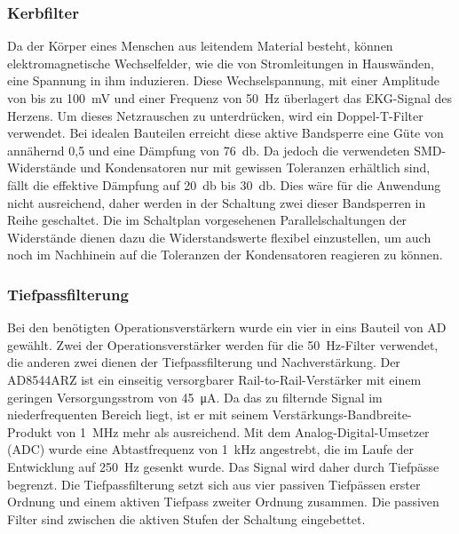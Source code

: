 \subsubsection{Kerbfilter}

Da der Körper eines Menschen aus leitendem Material besteht, können elektromagnetische Wechselfelder, wie die von Stromleitungen in Hauswänden, eine Spannung in ihm induzieren. Diese Wechselspannung, mit einer Amplitude von bis zu \SI{100}{\milli\volt} und einer Frequenz von \SI{50}{\hertz} überlagert das EKG-Signal des Herzens. Um dieses Netzrauschen zu unterdrücken, wird ein Doppel-T-Filter verwendet. Bei idealen Bauteilen erreicht diese aktive Bandsperre eine Güte von annähernd 0,5 und eine Dämpfung von \SI{76}{\decibel}. Da jedoch die verwendeten SMD-Widerstände und Kondensatoren nur mit gewissen Toleranzen erhältlich sind, fällt die effektive Dämpfung auf \SI{20}{\decibel} bis \SI{30}{\decibel}. Dies wäre für die Anwendung nicht ausreichend, daher werden in der Schaltung zwei dieser Bandsperren in Reihe geschaltet. Die im Schaltplan vorgesehenen Parallelschaltungen der Widerstände dienen dazu die Widerstandswerte flexibel einzustellen, um auch noch im Nachhinein auf die Toleranzen der Kondensatoren reagieren zu können. 

\subsubsection{Tiefpassfilterung}

Bei den benötigten Operationsverstärkern wurde ein vier in eins Bauteil von AD gewählt. Zwei der Operationsverstärker werden für die \SI{50}{\hertz}-Filter verwendet, die anderen zwei dienen der Tiefpassfilterung und Nachverstärkung. Der AD8544ARZ ist ein einseitig versorgbarer Rail-to-Rail-Verstärker mit einem geringen Versorgungsstrom von \SI{45}{\micro\ampere}. Da das zu filternde Signal im niederfrequenten Bereich liegt, ist er mit seinem Verstärkungs-Bandbreite-Produkt von \SI{1}{\mega\hertz} mehr als ausreichend. Mit dem Analog-Digital-Umsetzer (ADC) wurde eine Abtastfrequenz von \SI{1}{\kilo\hertz} angestrebt, die im Laufe der Entwicklung auf \SI{250}{\hertz} gesenkt wurde. Das Signal wird daher durch Tiefpässe begrenzt. Die Tiefpassfilterung setzt sich aus vier passiven Tiefpässen erster Ordnung und einem aktiven Tiefpass zweiter Ordnung zusammen. Die passiven Filter sind zwischen die aktiven Stufen der Schaltung eingebettet.

